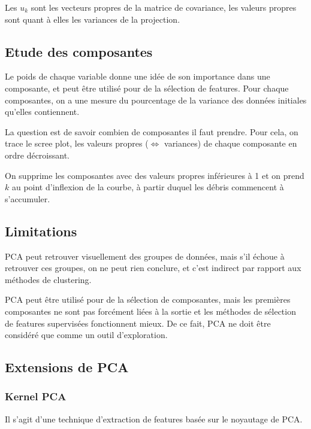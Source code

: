 	Les $u_k$ sont les vecteurs propres de la matrice de covariance, les valeurs propres sont quant à elles les variances de la projection.
	
	\subsection{Etude des composantes}
	
	
	Le poids de chaque variable donne une idée de son importance dans une composante, et peut être utilisé pour de la sélection de features. Pour chaque composantes, on a une mesure du pourcentage de la variance des données initiales qu'elles contiennent.
	
	La question est de savoir combien de composantes il faut prendre. Pour cela, on trace le scree plot, les valeurs propres ($\Leftrightarrow$ variances) de chaque composante en ordre décroissant.
	
	
	On supprime les composantes avec des valeurs propres inférieures à 1 et on prend $k$ au point d'inflexion de la courbe, à partir duquel les débris commencent à s'accumuler.
	
	\subsection{Limitations}
	
	PCA peut retrouver visuellement des groupes de données, mais s'il échoue à retrouver ces groupes, on ne peut rien conclure, et c'est indirect par rapport aux méthodes de clustering.
	
	PCA peut être utilisé pour de la sélection de composantes, mais les premières composantes ne sont pas forcément liées à la sortie et les méthodes de sélection de features supervisées fonctionnent mieux. De ce fait, PCA ne doit être considéré que comme un outil d'exploration.
	
	\subsection{Extensions de PCA}
	
		\subsubsection{Kernel PCA}
		
		Il s'agit d'une technique d'extraction de features basée sur le noyautage de PCA.
		
